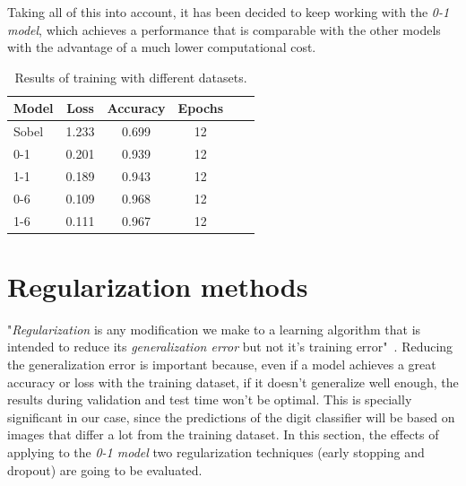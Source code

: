 Taking all of this into account, it has been decided to keep working with the \emph{\textit{0-1} model}, which achieves a performance that is comparable with the other models with the advantage of a much lower computational cost.

\begin{table}
	\centering
	\begin{tabular}{l*{4}{c}r}
		\textbf{Model} & \textbf{Loss} & \textbf{Accuracy} & \textbf{Epochs} \\
		\hline
		Sobel & 1.233 & 0.699 & 12 \\
		0-1 & 0.201 & 0.939 & 12 \\
		1-1 & 0.189 & 0.943 & 12 \\
		0-6 & 0.109 & 0.968 & 12 \\
		1-6 & 0.111 & 0.967 & 12 \\
	\end{tabular}
	\caption{Results of training with different datasets.}
	\label{tbl:datasets}
\end{table}

\section{Regularization methods}
"\emph{Regularization} is any modification we make to a learning algorithm that is intended to reduce its \emph{generalization error} but not it's training error"~\cite{Goodfellow-et-al-2016}. Reducing the generalization error is important because, even if a model achieves a great accuracy or loss with the training dataset, if it doesn't generalize well enough, the results during validation and test time won't be optimal. This is specially significant in our case, since the predictions of the digit classifier will be based on images that differ a lot from the training dataset. In this section, the effects of applying to the \emph{\textit{0-1} model} two regularization techniques (early stopping and dropout) are going to be evaluated. 

